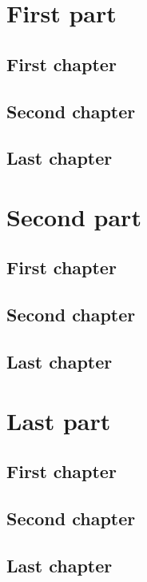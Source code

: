 \documentclass{book}
\begin{document}
\tableofcontents
\part{First part}
\chapter{First chapter}
\chapter{Second chapter}
\chapter{Last chapter}
\part{Second part}
\chapter{First chapter}
\chapter{Second chapter}
\chapter{Last chapter}
\part{Last part}
\chapter{First chapter}
\chapter{Second chapter}
\chapter{Last chapter}
\end{document}
